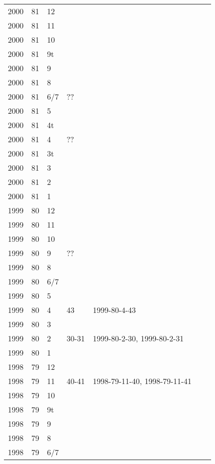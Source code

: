 \begin{longtable}{ |l|l|l|l|p{2.7cm}|l|p{2cm}| }
 2000 & 81 &    12 &         &  &  & \\
 2000 & 81 &    11 &         &  &  & \\
 2000 & 81 &    10 &         &  &  & \\
 2000 & 81 &    9t &         &  &  & \\
 2000 & 81 &     9 &         &  &  & \\
 2000 & 81 &     8 &         &  &  & \\
 2000 & 81 &   6/7 &     ??  &  &  & \\
 2000 & 81 &     5 &         &  &  & \\
 2000 & 81 &    4t &         &  &  & \\
 2000 & 81 &     4 &     ??  &  &  & \\
 2000 & 81 &    3t &         &  &  & \\
 2000 & 81 &     3 &         &  &  & \\
 2000 & 81 &     2 &         &    &  & \\
 2000 & 81 &     1 &         &  &  & \\
 1999 & 80 &    12 &         &  &  & \\
 1999 & 80 &    11 &         &  &  & \\
 1999 & 80 &    10 &         &  &  & \\
 1999 & 80 &     9 &     ??  &  &  & \\
 1999 & 80 &     8 &         &  &  & \\
 1999 & 80 &   6/7 &         &  &  & \\
 1999 & 80 &     5 &         &  &  & \\
 1999 & 80 &     4 &   43    & 1999-80-4-43  &  & \\
 1999 & 80 &     3 &         &  &  & \\
 1999 & 80 &     2 &   30-31 & 1999-80-2-30, 1999-80-2-31 &  & \\
 1999 & 80 &     1 &         &  &  & \\
 1998 & 79 &    12 &         &  &  & \\
 1998 & 79 &    11 &  40-41  & 1998-79-11-40, 1998-79-11-41  &  & \\
 1998 & 79 &    10 &         &  &  & \\
 1998 & 79 &    9t &         &  &  & \\
 1998 & 79 &     9 &         &  &  & \\
 1998 & 79 &     8 &         &  &  & \\
 1998 & 79 &   6/7 &         &  &  & \\

\end{longtable}
